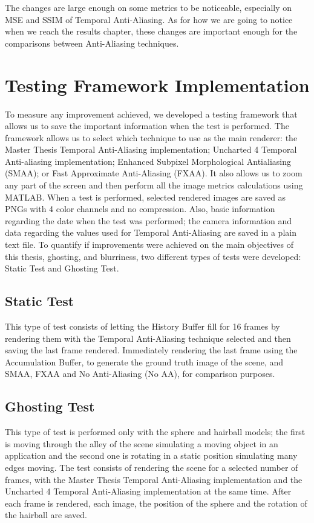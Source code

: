 \documentclass{cslthse-msc}
\begin{document}
The changes are large enough on some metrics to be noticeable, especially on MSE and SSIM   of Temporal Anti-Aliasing. As for how we are going to notice when we reach the results chapter, these changes are important enough for the comparisons between Anti-Aliasing techniques.

\section{Testing Framework Implementation}
To measure any improvement achieved, we developed a testing framework that allows us to save the important information when the test is performed. The framework allows us to select which technique to use as the main renderer: the Master Thesis Temporal Anti-Aliasing implementation; Uncharted 4 Temporal Anti-aliasing implementation; Enhanced Subpixel Morphological Antialiasing (SMAA); or Fast Approximate Anti-Aliasing (FXAA). It also allows us to zoom any part of the screen and then perform all the image metrics calculations using MATLAB.
When a test is performed, selected rendered images are saved as PNGs with 4 color channels and no compression. Also, basic information regarding the date when the test was performed; the camera information and data regarding the values used for Temporal Anti-Aliasing are saved in a plain text file.
To quantify if improvements were achieved on the main objectives of this thesis, ghosting, and blurriness, two different types of tests were developed: Static Test and Ghosting Test.

\subsection{Static Test}
This type of test consists of letting the History Buffer fill for 16 frames by rendering them with the Temporal Anti-Aliasing technique selected and then saving the last frame rendered. Immediately rendering the last frame using the Accumulation Buffer, to generate the ground truth image of the scene, and SMAA, FXAA and No Anti-Aliasing (No AA), for comparison purposes. 

\subsection{Ghosting Test}
This type of test is performed only with the sphere and hairball models; the first is moving through the alley of the scene simulating a moving object in an application and the second one is rotating in a static position simulating many edges moving. The test consists of rendering the scene for a selected number of frames, with the Master Thesis Temporal Anti-Aliasing implementation and the Uncharted 4 Temporal Anti-Aliasing implementation at the same time. After each frame is rendered, each image, the position of the sphere and the rotation of the hairball are saved.
\end{document}
